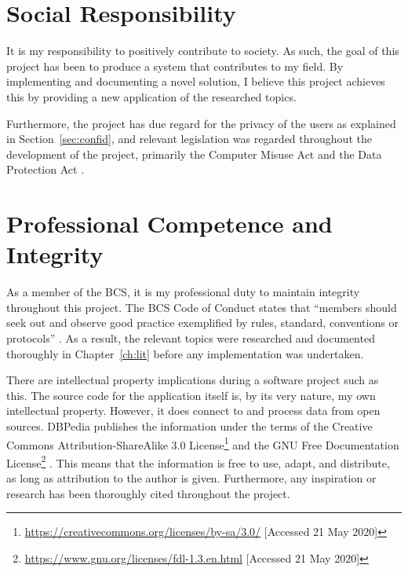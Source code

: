 \section{Social Responsibility}
It is my responsibility to positively contribute to society. As such, the goal of this project has been to produce a system that contributes to my field. By implementing and documenting a novel solution, I believe this project achieves this by providing a new application of the researched topics.

Furthermore, the project has due regard for the privacy of the users as explained in Section~\ref{sec:confid}, and relevant legislation was regarded throughout the development of the project, primarily the Computer Misuse Act \cite{cma} and the Data Protection Act \cite{dpa}.

\section{Professional Competence and Integrity}
As a member of the BCS, it is my professional duty to maintain integrity throughout this project. The BCS Code of Conduct states that ``members should seek out and observe good practice exemplified by rules, standard, conventions or protocols'' \cite{bcs2019conduct}. As a result, the relevant topics were researched and documented thoroughly in Chapter~\ref{ch:lit} before any implementation was undertaken. 

There are intellectual property implications during a software project such as this. The source code for the application itself is, by its very nature, my own intellectual property. However, it does connect to and process data from open sources. DBPedia publishes the information under the terms of the Creative Commons Attribution-ShareAlike 3.0 License\footnote{\url{https://creativecommons.org/licenses/by-sa/3.0/} [Accessed 21 May 2020]} and the GNU Free Documentation License\footnote{\url{https://www.gnu.org/licenses/fdl-1.3.en.html} [Accessed 21 May 2020]} \cite{dbpedia2019about}. This means that the information is free to use, adapt, and distribute, as long as attribution to the author is given. Furthermore, any inspiration or research has been thoroughly cited throughout the project.